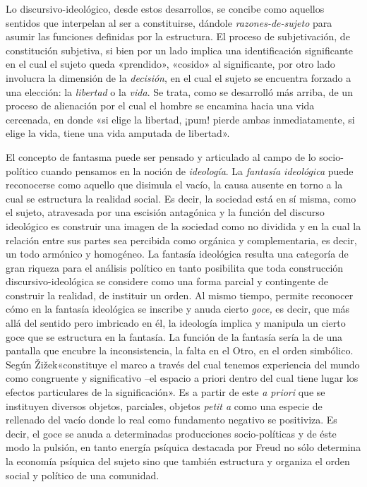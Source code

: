 Lo discursivo-ideológico, desde estos desarrollos, se concibe como aquellos sentidos que interpelan al ser a constituirse, dándole \emph{razones-de-sujeto} para asumir las funciones definidas por la estructura. El proceso de subjetivación, de constitución subjetiva, si bien por un lado implica una identificación significante en el cual el sujeto queda «prendido», «cosido» al significante, por otro lado involucra la dimensión de la \emph{decisión}, en el cual el sujeto se encuentra forzado a una elección: la \emph{libertad} o la \emph{vida}. Se trata, como se desarrolló más arriba, de un proceso de alienación por el cual el hombre se encamina hacia una vida cercenada, en donde «si elige la libertad, ¡pum! pierde ambas inmediatamente, si elige la vida, tiene una vida amputada de libertad».

El concepto de fantasma puede ser pensado y articulado al campo de lo socio-político cuando pensamos en la noción de \emph{ideología}. La \emph{fantasía ideológica} puede reconocerse como aquello que disimula el vacío, la causa ausente en torno a la cual se estructura la realidad social. Es decir, la sociedad está en sí misma, como el sujeto, atravesada por una escisión antagónica y la función del discurso ideológico es construir una imagen de la sociedad como no dividida y en la cual la relación entre sus partes sea percibida como orgánica y complementaria, es decir, un todo armónico y homogéneo. La fantasía ideológica resulta una categoría de gran riqueza para el análisis político en tanto posibilita que toda construcción discursivo-ideológica se considere como una forma parcial y contingente de construir la realidad, de instituir un orden. Al mismo tiempo, permite reconocer cómo en la fantasía ideológica se inscribe y anuda cierto \emph{goce, }es decir, que más allá del sentido pero imbricado en él, la ideología implica y manipula un cierto goce que se estructura en la fantasía. La función de la fantasía sería la de una pantalla que encubre la inconsistencia, la falta en el Otro, en el orden simbólico. Según Žižek«constituye el marco a través del cual tenemos experiencia del mundo como congruente y significativo --el espacio a priori dentro del cual tiene lugar los efectos particulares de la significación». Es a partir de este \emph{a priori} que se instituyen diversos objetos, parciales, objetos \emph{petit a} como una especie de rellenado del vacío donde lo real como fundamento negativo se positiviza. Es decir, el goce se anuda a determinadas producciones socio-políticas y de éste modo la pulsión, en tanto energía psíquica destacada por Freud no sólo determina la economía psíquica del sujeto sino que también estructura y organiza el orden social y político de una comunidad.

